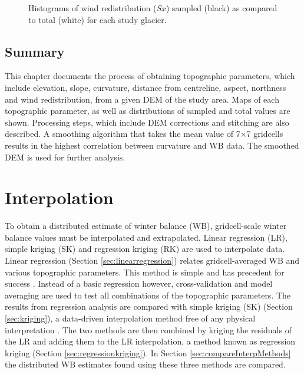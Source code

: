 \documentclass{sfuthesis}
\begin{document}
{\begin{figure}[H]
	\caption[Histograms of full and sampled wind redistribution ($Sx$)]{Histograms of wind redistribution ($Sx$) sampled (black) as compared to total (white) for each study glacier.}
	\label{sampledRange:Sx}
\end{figure}


\section{Summary}

This chapter documents the process of obtaining topographic parameters, which include elevation, slope, curvature, distance from centreline, aspect, northness and wind redistribution, from a given DEM of the study area. Maps of each topographic parameter, as well as distributions of sampled and total values are shown. Processing steps, which include DEM corrections and stitching are also described. A smoothing algorithm that takes the mean value of 7$\times$7 gridcells results in the highest correlation between curvature and WB data. The smoothed DEM is used for further analysis. 



\chapter{Interpolation}

To obtain a distributed estimate of winter balance (WB), gridcell-scale winter balance values must be interpolated and extrapolated. Linear regression (LR), simple kriging (SK) and regression kriging (RK) are used to interpolate data. Linear regression (Section \ref{sec:linearregression}) relates gridcell-averaged WB and various topographic parameters. This method is simple and has precedent for success \citep[e.g.][]{McGrath2015}. Instead of a basic regression however, cross-validation and model averaging are used to test all combinations of the topographic parameters. The results from regression analysis are compared with simple kriging (SK) (Section \ref{sec:kriging}), a data-driven interpolation method free of any physical interpretation \citep[e.g.][]{Hock1999}. The two methods are then combined by kriging the residuals of the LR and adding them to the LR interpolation, a method known as regression kriging (Section \ref{sec:regressionkriging}). In Section \ref{sec:compareInterpMethods} the distributed WB estimates found using these three methods are compared.

}
\end{document}
